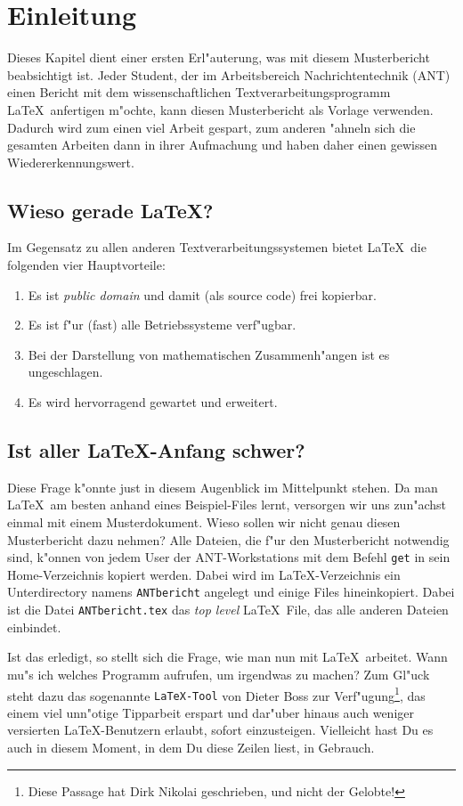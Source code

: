 \chapter{Einleitung} \label{CPTeinleit}
%
Dieses Kapitel dient einer ersten Erl"auterung, was mit diesem 
Musterbericht beabsichtigt ist. Jeder Student,
der im Arbeitsbereich Nachrichtentechnik (ANT) einen Bericht mit
dem wissenschaftlichen Textverarbeitungsprogramm \LaTeX\ anfertigen
m"ochte, kann diesen Musterbericht als Vorlage verwenden. Dadurch wird 
zum einen viel Arbeit gespart, zum anderen "ahneln sich die gesamten
Arbeiten dann in ihrer Aufmachung und haben daher einen gewissen 
Wiedererkennungswert.

\section{Wieso gerade \LaTeX?}
%
Im Gegensatz zu allen anderen Textverarbeitungssystemen bietet
\LaTeX\ die folgenden vier Hauptvorteile:
%
\begin{enumerate}
\item Es ist {\em public domain} und damit (als source code) frei kopierbar.
\item Es ist f"ur (fast) alle Betriebssysteme verf"ugbar.
\item Bei der Darstellung von mathematischen Zusammenh"angen ist es ungeschlagen.
\item Es wird hervorragend gewartet und erweitert.
\end{enumerate}


\section{Ist aller \LaTeX-Anfang schwer?} \label{SECallg}
%
Diese Frage k"onnte just in diesem Augenblick im Mittelpunkt stehen.
Da man \LaTeX\ am besten anhand eines Beispiel-Files lernt, versorgen
wir uns zun"achst einmal mit einem Musterdokument. Wieso sollen wir
nicht genau diesen Musterbericht dazu nehmen?
Alle Dateien, die f"ur den Musterbericht notwendig sind, k"onnen von jedem
User der ANT-Workstations mit dem Befehl {\tt get} in sein Home-Verzeichnis 
kopiert werden. Dabei wird im \LaTeX-Verzeichnis ein Unterdirectory namens
{\tt ANTbericht} angelegt und einige Files hineinkopiert.
Dabei ist die Datei {\tt ANTbericht.tex} das {\em top level}\/ \LaTeX\ File,
das alle anderen Dateien einbindet.

Ist das erledigt, so stellt sich die Frage, wie man nun mit \LaTeX\ arbeitet.
Wann mu"s ich welches Programm aufrufen, um irgendwas zu machen?
Zum Gl"uck steht dazu das sogenannte {\tt LaTeX-Tool} von Dieter Boss
zur Verf"ugung\footnote{Diese Passage hat Dirk Nikolai geschrieben, und nicht
der Gelobte!}, das einem viel unn"otige Tipparbeit erspart und
dar"uber hinaus auch weniger versierten \LaTeX-Benutzern erlaubt, 
sofort einzusteigen. Vielleicht hast Du es auch in diesem Moment, in dem 
Du diese Zeilen liest, in Gebrauch.

